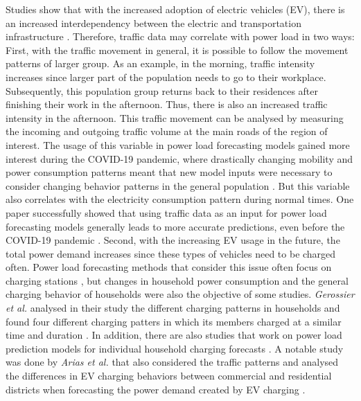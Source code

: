 Studies show that with the increased adoption of electric vehicles (EV), 
there is an increased interdependency between the electric and 
transportation infrastructure \cite{interdependnytrafficenergy}. 
Therefore, traffic data may correlate with power load 
in two ways:
First, with the traffic movement in general, it is possible to follow the
movement patterns of larger group. As an example, in the morning,
traffic intensity increases since larger part of the population needs
to go to their workplace. Subsequently, this population group
returns back to their residences after finishing their work in the afternoon.
Thus, there is also an increased traffic intensity in the afternoon.
This traffic movement can be analysed by measuring the 
incoming and outgoing traffic volume at the main roads of the 
region of interest. The usage of this variable in power load
forecasting models gained more interest during the COVID-19 pandemic, 
where drastically changing mobility and power consumption 
patterns meant that new model inputs were necessary to consider changing
behavior patterns in the general population 
\cite{covidtrafficpower} \cite{covidtrafficpower2}.
But this variable also correlates with the electricity consumption pattern
during normal times. One paper successfully showed that
using traffic data as an input for power load
forecasting models generally leads to more accurate predictions, even before
the COVID-19 pandemic \cite{causalmodeltrafficelectricity}.
Second, with the increasing EV usage in the future, 
the total power demand increases since these types of vehicles 
need to be charged often. Power load forecasting methods that consider this
issue often focus on charging stations \cite{evcharchingstations}
\cite{evcharchingstations2}, but changes in household power consumption 
and the general charging behavior of households
were also the objective of some studies. \textit{Gerossier et al.}
analysed in their study the different charging patterns in households
and found four different charging patters in which its members charged at 
a similar time and duration \cite{gerossier2019modeling}.
In addition, there are also studies that work on
power load prediction models for individual household
charging forecasts \cite{skala2023interval}. 
A notable study was done by \textit{Arias et al.} that also considered the traffic patterns
and analysed the differences in EV charging behaviors between
commercial and residential districts when forecasting the power demand
created by EV charging \cite{arias2016electric}.


